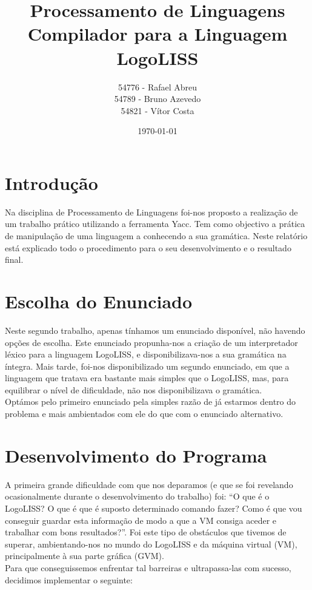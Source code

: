\documentclass[12pt,a4paper,oneside]{article}
\title{\textbf{Processamento de Linguagens}\\Compilador para a Linguagem LogoLISS}
\author{54776 - Rafael Abreu\\54789 - Bruno Azevedo\\54821 - Vítor Costa}
\date{\today}
\newenvironment{codefold}{}{}
\begin{document}
\begin{codefold}

\maketitle
\newpage
\tableofcontents
\newpage

\section{Introdução}
\indent Na disciplina de Processamento de Linguagens foi-nos proposto a realização de um trabalho prático utilizando a ferramenta Yacc. Tem como objectivo a prática de 
manipulação de uma linguagem a conhecendo a sua gramática. Neste relatório está explicado todo o procedimento para o seu desenvolvimento e o resultado final.\\

\newpage
\section{Escolha do Enunciado}

\indent Neste segundo trabalho, apenas tínhamos um enunciado disponível, não havendo opções de escolha. Este enunciado propunha-nos a criação de um interpretador léxico
para a linguagem LogoLISS, e disponibilizava-nos a sua gramática na íntegra. Mais tarde, foi-nos disponibilizado um segundo enunciado, em que a linguagem que tratava era
bastante mais simples que o LogoLISS, mas, para equilibrar o nível de dificuldade, não nos disponibilizava o gramática.\\
\indent Optámos pelo primeiro enunciado pela simples razão de já estarmos dentro do problema e mais ambientados com ele do que com o enunciado alternativo.\\

\newpage
\section{Desenvolvimento do Programa}

\indent A primeira grande dificuldade com que nos deparamos (e que se foi revelando ocasionalmente durante o desenvolvimento do trabalho) foi: ``O que é o LogoLISS?
O que é que é suposto determinado comando fazer? Como é que vou conseguir guardar esta informação de modo a que a VM consiga aceder e trabalhar com bons resultados?''.
Foi este tipo de obstáculos que tivemos de superar, ambientando-nos no mundo do LogoLISS e da máquina virtual (VM), principalmente à sua parte gráfica (GVM).\\
\indent Para que conseguissemos enfrentar tal barreiras e ultrapassa-las com sucesso, decidimos implementar o seguinte:


\end{codefold}
\end{document}
